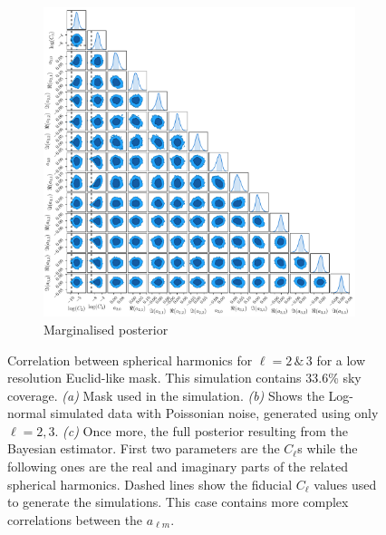 \begin{figure}
\begin{subfigure}[b]{\textwidth}
 \includegraphics[width=1.05\textwidth]{BPL-FIGS/Flask-Euclid-lowEll-N8_trianglePlot.pdf}
  \caption{Marginalised posterior}
  \label{fig:BPL:LN-Euclid-N8-triang}
\end{subfigure}
\caption[Investigation of correlation in spherical harmonics for $\ell = 2\, \& \, 3$ for a low resolution Euclid-like mask containing a 33.6\% sky fraction]{Correlation between spherical harmonics for $\ell = 2\, \& \, 3$ for a low resolution Euclid-like mask. This simulation contains 33.6\% sky coverage. \textit{(a)} Mask used in the simulation. \textit{(b)} Shows the Log-normal simulated data with Poissonian noise, generated using only $\ell = 2,3$. \textit{(c)} Once more, the full posterior resulting from the Bayesian estimator. First two parameters are the $C_{\ell}$s while the following ones are the real and imaginary parts of the related spherical harmonics. Dashed lines show the fiducial $C_{\ell}$ values used to generate the simulations. This case contains more complex correlations between the $a_{\ell m}$.}
\label{fig:BPL:Euclid-N8}
\end{figure}

